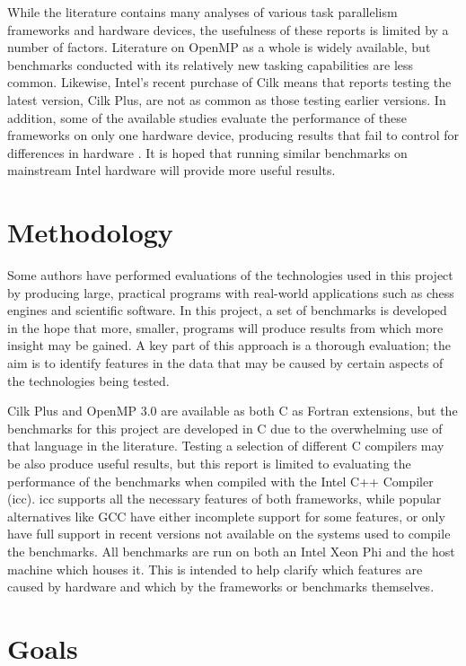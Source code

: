 \documentclass{report}
\begin{document}
While the literature contains many analyses of various task parallelism frameworks and hardware devices, the usefulness of these reports is limited by a number of factors. Literature on OpenMP as a whole is widely available, but benchmarks conducted with its relatively new tasking capabilities are less common. Likewise, Intel's recent purchase of Cilk means that reports testing the latest version, Cilk Plus, are not as common as those testing earlier versions. In addition, some of the available studies evaluate the performance of these frameworks on only one hardware device, producing results that fail to control for differences in hardware \cite{Duran09}. It is hoped that running similar benchmarks on mainstream Intel hardware will provide more useful results.

\section{Methodology} \label{Sec:methodology}

Some authors have performed evaluations of the technologies used in this project by producing large, practical programs with real-world applications such as chess engines and scientific software\cite{Dailey01}. In this project, a set of benchmarks is developed in the hope that more, smaller, programs will produce results from which more insight may be gained. A key part of this approach is a thorough evaluation; the aim is to identify features in the data that may be caused by certain aspects of the technologies being tested.

Cilk Plus and OpenMP 3.0 are available as both C as Fortran extensions, but the benchmarks for this project are developed in C due to the overwhelming use of that language in the literature. Testing a selection of different C compilers may be also produce useful results, but this report is limited to evaluating the performance of the benchmarks when compiled with the Intel C++ Compiler (icc). icc supports all the necessary features of both frameworks, while popular alternatives like GCC have either incomplete support for some features, or only have full support in recent versions not available on the systems used to compile the benchmarks. All benchmarks are run on both an Intel Xeon Phi and the host machine which houses it. This is intended to help clarify which features are caused by hardware and which by the frameworks or benchmarks themselves.

\section{Goals} \label{Sec:goals}
\end{document}

